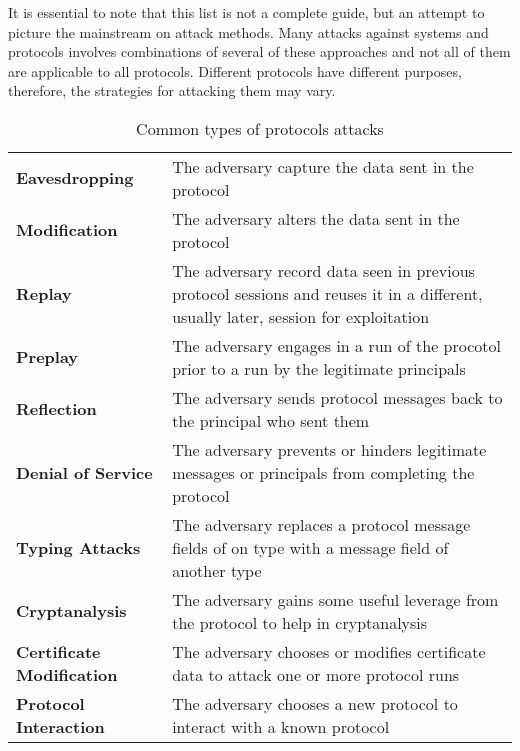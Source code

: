 It is essential to note that this list is not a complete guide, but an attempt to picture the mainstream on attack methods. Many attacks against systems and protocols involves combinations of several of these approaches and not all of them are applicable to all protocols. Different protocols have different purposes, therefore, the strategies for attacking them may vary.

\begin{table}
  \caption{Common types of protocols attacks}
  \label{protocol-attacks}

  {\def\arraystretch{1.5}
  \begin{tabular}[c]{l p{10cm}}
    \hline
    \textbf{Eavesdropping} & The adversary capture the data sent in the protocol \\
    \textbf{Modification} & The adversary alters the data sent in the protocol \\
    \textbf{Replay} & The adversary record data seen in previous protocol sessions and reuses it in a different, usually later, session for exploitation \\
    \textbf{Preplay} & The adversary engages in a run of the procotol prior to a run by the legitimate principals \\
    \textbf{Reflection} & The adversary sends protocol messages back to the principal who sent them \\
    \textbf{Denial of Service} & The adversary prevents or hinders legitimate messages or principals from completing the protocol \\
    \textbf{Typing Attacks} & The adversary replaces a protocol message fields of on type with a message field of another type \\
    \textbf{Cryptanalysis} & The adversary gains some useful leverage from the protocol to help in cryptanalysis \\
    \textbf{Certificate Modification} & The adversary chooses or modifies certificate data to attack one or more protocol runs \\
    \textbf{Protocol Interaction} & The adversary chooses a new protocol to interact with a known protocol \\
    \hline
  \end{tabular}
  }

\end{table}

